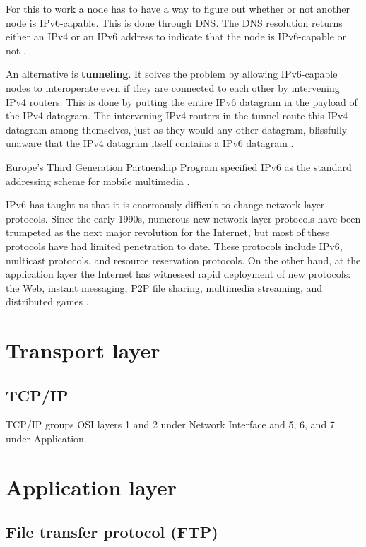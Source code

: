 \documentclass[12pt, oneside]{book}
\begin{document}
For this to work a node has to have a way to figure out whether or not another node is IPv6-capable. This is done through DNS. The DNS resolution returns either an IPv4 or an IPv6 address to indicate that the node is IPv6-capable or not \cite[p.~360]{computer-networking-kurose-2012}.

An alternative is \textbf{tunneling}. It solves the problem by allowing IPv6-capable nodes to interoperate even if they are connected to each other by intervening IPv4 routers. This is done by putting the entire IPv6 datagram in the payload of the IPv4 datagram. The intervening IPv4 routers in the tunnel route this IPv4 datagram among themselves, just as they would any other datagram, blissfully unaware that the IPv4 datagram itself contains a IPv6 datagram \cite[p.~360]{computer-networking-kurose-2012}.

Europe's Third Generation Partnership Program specified IPv6 as the standard addressing scheme for mobile multimedia \cite[p.~362]{computer-networking-kurose-2012}.

IPv6 has taught us that it is enormously difficult to change network-layer protocols. Since the early 1990s, numerous new network-layer protocols have been trumpeted as the next major revolution for the
Internet, but most of these protocols have had limited penetration to date.
These protocols include IPv6, multicast protocols, and resource reservation protocols.
On the other hand, at the application layer the Internet has witnessed rapid deployment of new protocols: the Web, instant messaging, P2P file sharing, multimedia streaming, and distributed games \cite[p.~362]{computer-networking-kurose-2012}.

\section{Transport layer}

\subsection{TCP/IP}

TCP/IP groups OSI layers 1 and 2 under Network Interface and 5, 6, and 7 under Application.

\section{Application layer}

\subsection{File transfer protocol (FTP)}
\end{document}
